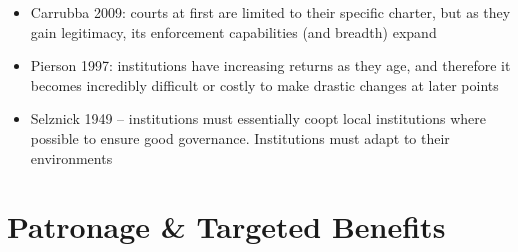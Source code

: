 \documentclass[12pt]{article}
\begin{document}
\begin{itemize}
    \item Carrubba 2009: courts at first are limited to their specific charter, but as they gain legitimacy, its enforcement capabilities (and breadth) expand
    \item Pierson 1997: institutions have increasing returns as they age, and therefore it becomes incredibly difficult or costly to make drastic changes at later points
    \item Selznick 1949 -- institutions must essentially coopt local institutions where possible to ensure good governance. Institutions must adapt to their environments
\end{itemize}





\section*{Patronage \& Targeted Benefits}
\end{document}

